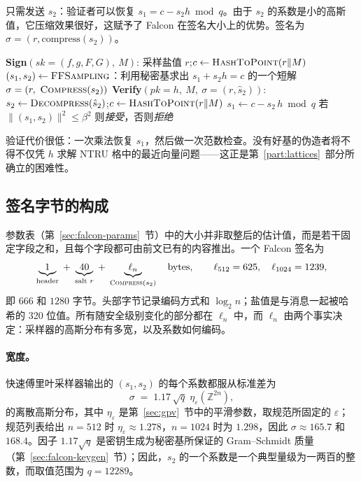 只需发送 $s_2$：验证者可以恢复 $s_1 = c - s_2 h \bmod q$。由于 $s_2$ 的系数是小的高斯值，它压缩效果很好，这赋予了 Falcon 在签名大小上的优势。签名为 $\sigma = (r, \text{compress}(s_2))$。

\begin{algorithm}[H]
\caption{FN-DSA.Sign / Verify（教学形式）}
\label{alg:fndsa-signverify}
\begin{algorithmic}[1]
\Statex \textbf{Sign}$(sk=(f,g,F,G),\ M)$:
\State 采样盐值 $r$;\quad $c \gets \textsc{HashToPoint}(r\|M)$
\State $(s_1,s_2) \gets \textsc{FFSampling}$：利用秘密基求出 $s_1+s_2h=c$ 的一个短解
\State \Return $\sigma=(r,\ \textsc{Compress}(s_2))$
\Statex
\Statex \textbf{Verify}$(pk=h,\ M,\ \sigma=(r,\hat s_2))$:
\State $s_2 \gets \textsc{Decompress}(\hat s_2)$;\quad $c \gets \textsc{HashToPoint}(r\|M)$
\State $s_1 \gets c - s_2\,h \bmod q$ 
\State \Return 若 $\|(s_1,s_2)\|^2 \le \beta^2$ 则\emph{接受}，否则\emph{拒绝} 
\end{algorithmic}
\end{algorithm}

验证代价很低：一次乘法恢复 $s_1$，然后做一次范数检查。没有好基的伪造者将不得不仅凭 $h$ 求解 NTRU 格中的最近向量问题——这正是第~\ref{part:lattices}~部分所确立的困难性。

\subsection{签名字节的构成}
\label{sec:falcon-sizes}

参数表（第~\ref{sec:falcon-params}~节）中的大小并非取整后的估计值，而是若干固定字段之和，且每个字段都可由前文已有的内容推出。一个 Falcon 签名为
\[
\underbrace{1}_{\text{header}} \;+\; \underbrace{40}_{\text{salt }r} \;+\; \underbrace{\ell_n}_{\textsc{Compress}(s_2)} \quad\text{bytes},
\qquad \ell_{512}=625,\quad \ell_{1024}=1239,
\]
即 $666$ 和 $1280$ 字节。头部字节记录编码方式和 $\log_2 n$；盐值是与消息一起被哈希的 320 位值。所有随安全级别变化的部分都在 $\ell_n$ 中，而 $\ell_n$ 由两个事实决定：采样器的高斯分布有多宽，以及系数如何编码。

\paragraph{宽度。}快速傅里叶采样器输出的 $(s_1,s_2)$ 的每个系数都服从标准差为
\[
\sigma \;=\; 1.17\,\sqrt{q}\;\eta_\varepsilon(\mathbb{Z}^{2n}),
\]
的离散高斯分布，其中 $\eta_\varepsilon$ 是第~\ref{sec:gpv}~节中的平滑参数，取规范所固定的 $\varepsilon$；规范列表给出 $n=512$ 时 $\eta_\varepsilon \approx 1.278$，$n=1024$ 时为 $1.298$，因此 $\sigma \approx 165.7$ 和 $168.4$。因子 $1.17\sqrt{q}$ 是密钥生成为秘密基所保证的 Gram--Schmidt 质量（第~\ref{sec:falcon-keygen}~节）；因此，$s_2$ 的一个系数是一个典型量级为一两百的整数，而取值范围为 $q=12289$。

